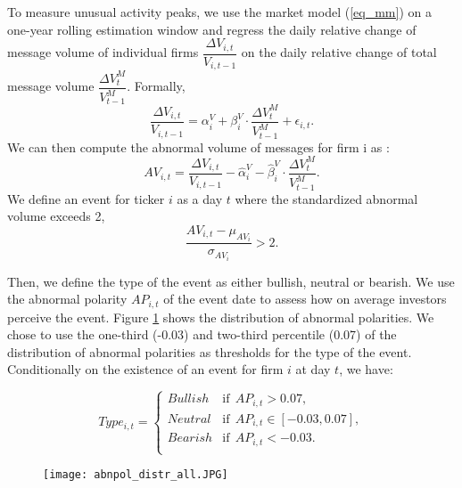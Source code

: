 To measure unusual activity peaks, we use the market model (\ref{eq_mm}) on a one-year rolling estimation window and regress the daily relative change of message volume of individual firms $\dfrac{\Delta V_{i,t}}{V_{i,t-1}}$ on the daily relative change of total message volume $\dfrac{\Delta V_t^M}{V_{t-1}^M}$. Formally,
\[     \dfrac{\Delta V_{i,t}}{V_{i,t-1}} = \alpha_i^V + \beta_i^V \cdot \dfrac{\Delta V_t^M}{V_{t-1}^M} + \epsilon_{i,t}.\]
We can then compute the abnormal volume of messages for firm i as : 
\[     AV_{i,t} = \dfrac{\Delta V_{i,t}}{V_{i,t-1}} - \hat{\alpha}_i^V - \hat{\beta}_i^V \cdot \dfrac{\Delta V_t^M}{V_{t-1}^M}. \]
We define an event for ticker $i$ as a day $t$ where the standardized abnormal volume exceeds 2, 
\[   \dfrac{AV_{i,t} - \mu_{AV_i}}{\sigma_{AV_i}} > 2.\]





Then, we define the type of the event as either bullish, neutral or bearish. We use the abnormal polarity $AP_{i,t}$ of the event date to assess how on average investors perceive the event. Figure \ref{fig:abnpol_all} shows the distribution of abnormal polarities. We chose to use the one-third (-0.03) and two-third percentile (0.07) of the distribution of abnormal polarities as thresholds for the type of the event. Conditionally on the existence of an event for firm $i$ at day $t$, we have:

\[     Type_{i,t}= \begin{cases}
      Bullish  & \text{if}\ \ AP_{i,t}> 0.07, \\
      Neutral  & \text{if}\ \ AP_{i,t} \in [-0.03, 0.07], \\
      Bearish  & \text{if}\ \ AP_{i,t} < -0.03. \\
\end{cases} \]


\begin{figure}[h]
    \centering
    \texttt{[image: abnpol\_distr\_all.JPG]}
    \label{fig:abnpol_all}
\end{figure}



